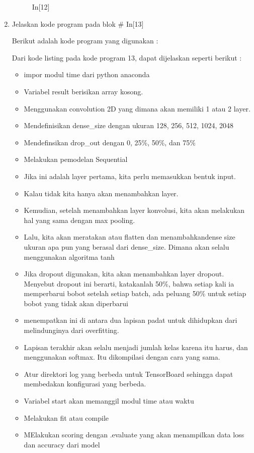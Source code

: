 \begin{enumerate}
\begin{figure}[!htbp]
	\caption{In[12]}
	\label{c7_19}
\end{figure}
\item Jelaskan kode program pada blok \# In[13]
\par Berikut adalah kode program yang digunakan :

\par Dari kode listing pada kode program 13, dapat dijelaskan seperti berikut :
\begin{itemize}
\item impor modul time dari python anaconda
\item Variabel result berisikan array kosong.
\item Menggunakan convolution 2D yang dimana akan memiliki 1 atau 2 layer.
\item Mendefinisikan dense\_size dengan ukuran 128, 256, 512, 1024, 2048
\item Mendefinsikan drop\_out dengan 0, 25\%, 50\%, dan 75\%
\item Melakukan pemodelan Sequential
\item Jika ini adalah layer pertama, kita perlu memasukkan bentuk input.
\item Kalau tidak kita hanya akan menambahkan layer.
\item Kemudian, setelah menambahkan layer konvolusi, kita akan melakukan hal yang sama dengan max pooling.
\item  Lalu, kita akan meratakan atau flatten dan menambahkandense size ukuran apa pun yang berasal dari dense\_size. Dimana akan selalu menggunakan algoritma tanh
\item Jika dropout digunakan, kita akan menambahkan layer dropout. Menyebut dropout ini berarti, katakanlah 50\%, bahwa setiap kali ia memperbarui bobot setelah setiap batch, ada peluang 50\% untuk setiap bobot yang tidak akan diperbarui
\item menempatkan ini di antara dua lapisan padat untuk dihidupkan dari melindunginya dari overfitting.
\item  Lapisan terakhir akan selalu menjadi jumlah kelas karena itu harus, dan menggunakan softmax. Itu dikompilasi dengan cara yang sama.
\item Atur direktori log yang berbeda untuk TensorBoard sehingga dapat membedakan konfigurasi yang berbeda.
\item Variabel start akan memanggil modul time atau waktu
\item Melakukan fit atau compile 
\item MElakukan scoring dengan .evaluate yang akan menampilkan data loss dan accuracy dari model

\end{itemize}
\end{enumerate}
